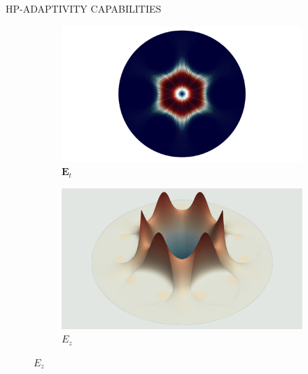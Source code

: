 \documentclass[debug]{beamer} %
\begin{document}
\begin{frame}
\begin{minipage}[t]{0.45\textwidth}
\begin{block}{\boxnumber HP-ADAPTIVITY CAPABILITIES }
			\begin{figure}[hb]
	        	\begin{mdframed}[backgroundcolor=bggrey]
					\centering
					\begin{subfigure}[b]{.4999\textwidth}
						\centering
						\caption*{$\displaystyle\bm{E}_t$}
						\includegraphics[width=1\linewidth]{images/et1posterHoley.png}%
					\end{subfigure}\hfill
					\begin{subfigure}[b]{.4999\textwidth}
						\centering
						\caption*{$\displaystyle E_z$}
						\includegraphics[width=1\linewidth]{images/ez1posterHoley.png}%
					\end{subfigure}


\end{mdframed}
\end{figure}
\end{block}
\end{minipage}
\end{frame}
\end{document}
